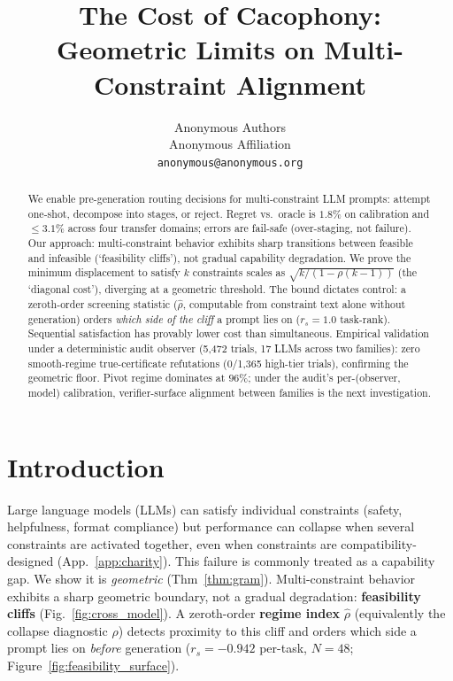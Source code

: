 \documentclass{article}
\title{The Cost of Cacophony:\\Geometric Limits on Multi-Constraint Alignment}
\author{%
  Anonymous Authors\\
  Anonymous Affiliation\\
  \texttt{anonymous@anonymous.org}
}
\theoremstyle{plain}
\theoremstyle{definition}
\theoremstyle{remark}
\newcommand{\rhohat}{\hat{\rho}}
\newcommand{\appref}[1]{App.~\ref{#1}}
\begin{document}
\maketitle

\begin{abstract}
We enable pre-generation routing decisions for multi-constraint LLM prompts: attempt one-shot, decompose into stages, or reject. Regret vs.\ oracle is $1.8\%$ on calibration and $\le 3.1\%$ across four transfer domains; errors are fail-safe (over-staging, not failure).
Our approach: multi-constraint behavior exhibits sharp transitions between feasible and infeasible (`feasibility cliffs'), not gradual capability degradation.
We prove the minimum displacement to satisfy $k$ constraints scales as $\sqrt{k/(1{-}\rho(k{-}1))}$ (the `diagonal cost'), diverging at a geometric threshold. The bound dictates control: a zeroth-order screening statistic ($\rhohat$, computable from constraint text alone without generation) orders \emph{which side of the cliff} a prompt lies on ($r_s{=}1.0$ task-rank). Sequential satisfaction has provably lower cost than simultaneous.
Empirical validation under a deterministic audit observer (5{,}472 trials, 17 LLMs across two families): zero smooth-regime true-certificate refutations (0/1{,}365 high-tier trials), confirming the geometric floor. Pivot regime dominates at $96\%$; under the audit's per-(observer, model) calibration, verifier-surface alignment between families is the next investigation.
\end{abstract}

\section{Introduction}\label{sec:intro}

Large language models (LLMs) can satisfy individual constraints (safety, helpfulness, format compliance) but performance can collapse when several constraints are activated together, even when constraints are compatibility-designed (\appref{app:charity}). This failure is commonly treated as a capability gap. We show it is \emph{geometric} (Thm~\ref{thm:gram}). Multi-constraint behavior exhibits a sharp geometric boundary, not a gradual degradation: \textbf{feasibility cliffs} (Fig.~\ref{fig:cross_model}). A zeroth-order \textbf{regime index} $\rhohat$ (equivalently the collapse diagnostic $\hat{\rho}$) detects proximity to this cliff and orders which side a prompt lies on \emph{before} generation ($r_s{=}{-}0.942$ per-task, $N{=}48$; Figure~\ref{fig:feasibility_surface}).
\end{document}
